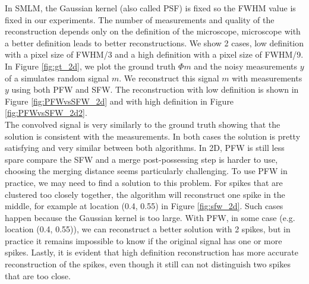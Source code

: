 \documentclass[a4paper,12pt,oneside]{report}
\theoremstyle{named}
\begin{document}
In SMLM, the Gaussian kernel (also called PSF) is fixed so the FWHM value is fixed in our experiments. The number of measurements and quality of the reconstruction depends only on the definition of the microscope, microscope with a better definition leads to better reconstructions. We show 2 cases, low definition with a pixel size of FWHM/3 and a high definition with a pixel size of FWHM/9. In Figure \ref{fig:gt_2d}, we plot the ground truth $\Phi m$ and the noisy measurements $y$ of a simulates random signal $m$. We reconstruct this signal $m$ with measurements $y$ using both PFW and SFW. The reconstruction with low definition is shown in Figure \ref{fig:PFWvsSFW_2d} and with high definition in Figure \ref{fig:PFWvsSFW_2d2}.\\



The convolved signal is very similarly to the ground truth showing that the solution is consistent with the measurements. In both cases the solution is pretty satisfying and very similar between both algorithms. In 2D, PFW is still less spare compare the SFW and a merge post-possessing step is harder to use, choosing the merging distance seems particularly challenging. To use PFW in practice, we may need to find a solution to this problem. For spikes that are clustered too closely together, the algorithm will reconstruct one spike in the middle, for example at location (0.4, 0.55) in Figure \ref{fig:sfw_2d}. Such cases happen because the Gaussian kernel is too large. With PFW, in some case (e.g. location (0.4, 0.55)), we can reconstruct a better solution with 2 spikes, but in practice it remains impossible to know if the original signal has one or more spikes. Lastly, it is evident that high definition reconstruction has more accurate reconstruction of the spikes, even though it still can not distinguish two spikes that are too close.
\end{document}
